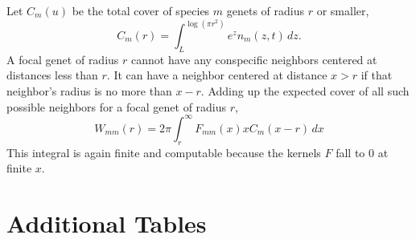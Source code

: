 \documentclass[11pt]{article}
\begin{document}
Let $C_m(u)$ be the total cover of species $m$ genets of radius $r$ or smaller, 
\begin{equation}
C_m(r) = \int_L^{\log(\pi r^2)}{\! \! \! e^z n_m(z,t) \, dz} .
\label{eqn:cm}
\end{equation}
A focal genet of radius $r$ cannot have any conspecific neighbors centered 
at distances less than $r$. It can have a neighbor centered at distance $x>r$ if that neighbor's
radius is no more than $x-r$. Adding up the expected cover of all such possible neighbors
for a focal genet of radius $r$,    
\begin{equation}
W_{mm}(r) = 2 \pi \int_r^{\infty}F_{mm}(x) x C_m(x-r) \, dx
\label{eqn:wbarmr} 
\end{equation}
This integral is again finite and computable because the kernels $F$ fall to 0 at finite $x$. 

\clearpage 
\newpage  
\section{Additional Tables} 

\end{document}

